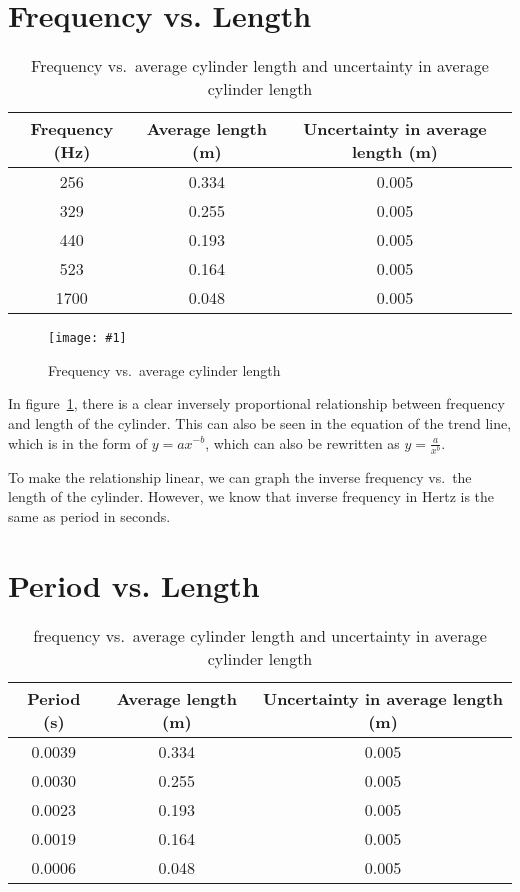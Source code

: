 \documentclass{report}
\newcommand{\graph}[2]{
  \begin{figure}[H]
    \medskip
    \centering
    \texttt{[image: \#1]}
    \caption{#2}
    \medskip\label{fig:#1}
  \end{figure}
}
\begin{document}
\section{Frequency vs. Length}\label{sec:freq-vs-length}

\begin{table}[H]
  \centering
  \begin{tabular}{@{}ccc@{}}
    \toprule
    Frequency (Hz) & Average length (m) & Uncertainty in average
    length (m) \\
    \midrule
    256 & 0.334 & 0.005 \\
    329 & 0.255 & 0.005 \\
    440 & 0.193 & 0.005 \\
    523 & 0.164 & 0.005 \\
    1700 & 0.048 & 0.005 \\
    \bottomrule
  \end{tabular}
  \caption{Frequency vs.\ average cylinder length and uncertainty in
  average cylinder length}\label{tab:freq-vs-length}
\end{table}

\graph{freq-vs-length}{Frequency vs.\ average cylinder length}

In figure~\ref{fig:freq-vs-length}, there is a clear inversely proportional
relationship between frequency and length of the cylinder. This can
also be seen in the equation of the trend line, which is in the form
of \(y=ax^{-b}\), which can also be rewritten as \(y=\frac{a}{x^b}\).

To make the relationship linear, we can graph the inverse frequency
vs.\ the length of the cylinder. However, we know that inverse
frequency in Hertz is the same as period in seconds.

\section{Period vs. Length}

\begin{table}[H]
  \centering
  \begin{tabular}{@{}ccc@{}}
    \toprule
    Period (s) & Average length (m) & Uncertainty in average length (m) \\
    \midrule
    0.0039 & 0.334 & 0.005 \\
    0.0030 & 0.255 & 0.005 \\
    0.0023 & 0.193 & 0.005 \\
    0.0019 & 0.164 & 0.005 \\
    0.0006 & 0.048 & 0.005 \\
    \bottomrule
  \end{tabular}
  \caption{frequency vs.\ average cylinder length and uncertainty in
  average cylinder length}\label{tab:period-vs-length}
\end{table}
\end{document}
